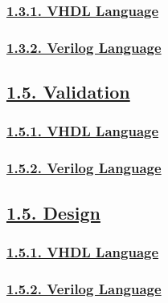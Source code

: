 \documentclass[
]{article}
\begin{document}
\hypertarget{vhdl-language}{%
\subsubsection{\texorpdfstring{\protect\hyperlink{vhdl-language-3}{1.3.1.
VHDL Language}}{1.3.1. VHDL Language}}\label{vhdl-language}}

\hypertarget{verilog-language}{%
\subsubsection{\texorpdfstring{\protect\hyperlink{verilog-language-3}{1.3.2.
Verilog Language}}{1.3.2. Verilog Language}}\label{verilog-language}}

\hypertarget{validation}{%
\subsection{\texorpdfstring{\protect\hyperlink{validation-1}{1.5.
Validation}}{1.5. Validation}}\label{validation}}

\hypertarget{vhdl-language-1}{%
\subsubsection{\texorpdfstring{\protect\hyperlink{vhdl-language-5}{1.5.1.
VHDL Language}}{1.5.1. VHDL Language}}\label{vhdl-language-1}}

\hypertarget{verilog-language-1}{%
\subsubsection{\texorpdfstring{\protect\hyperlink{verilog-language-5}{1.5.2.
Verilog Language}}{1.5.2. Verilog Language}}\label{verilog-language-1}}

\hypertarget{design}{%
\subsection{\texorpdfstring{\protect\hyperlink{design-1}{1.5.
Design}}{1.5. Design}}\label{design}}

\hypertarget{vhdl-language-2}{%
\subsubsection{\texorpdfstring{\protect\hyperlink{vhdl-language-5}{1.5.1.
VHDL Language}}{1.5.1. VHDL Language}}\label{vhdl-language-2}}

\hypertarget{verilog-language-2}{%
\subsubsection{\texorpdfstring{\protect\hyperlink{verilog-language-5}{1.5.2.
Verilog Language}}{1.5.2. Verilog Language}}\label{verilog-language-2}}
\end{document}

